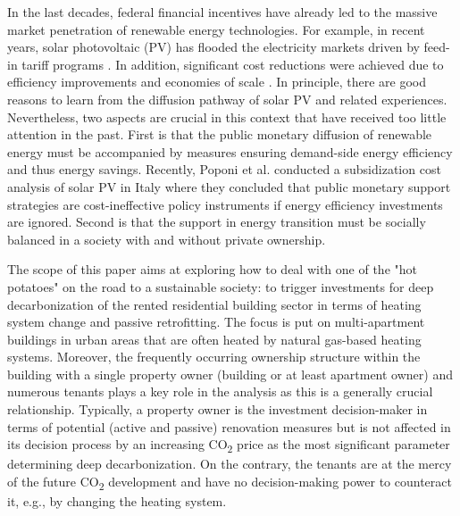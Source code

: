 In the last decades, federal financial incentives have already led to the massive market penetration of renewable energy technologies. For example, in recent years, solar photovoltaic (PV) has flooded the electricity markets driven by feed-in tariff programs \cite{hoppmann2014compulsive}. In addition, significant cost reductions were achieved due to efficiency improvements and economies of scale \cite{haas2011historical}. In principle, there are good reasons to learn from the diffusion pathway of solar PV and related experiences. Nevertheless, two aspects are crucial in this context that have received too little attention in the past. First is that the public monetary diffusion of renewable energy must be accompanied by measures ensuring demand-side energy efficiency and thus energy savings. Recently, Poponi et al. \cite{poponi2021subsidisation} conducted a subsidization cost analysis of solar PV in Italy where they concluded that public monetary support strategies are cost-ineffective policy instruments if energy efficiency investments are ignored. Second is that the support in energy transition must be socially balanced in a society with and without private ownership.\vspace{0.5cm}

The scope of this paper aims at exploring how to deal with one of the "hot potatoes" on the road to a sustainable society: to trigger investments for deep decarbonization of the rented residential building sector in terms of heating system change and passive retrofitting. The focus is put on multi-apartment buildings in urban areas that are often heated by natural gas-based heating systems. Moreover, the frequently occurring ownership structure within the building with a single property owner (building or at least apartment owner) and numerous tenants plays a key role in the analysis as this is a generally crucial relationship. Typically, a property owner is the investment decision-maker in terms of potential (active and passive) renovation measures but is not affected in its decision process by an increasing CO\textsubscript{2} price as the most significant parameter determining deep decarbonization. On the contrary, the tenants are at the mercy of the future CO\textsubscript{2} development and have no decision-making power to counteract it, e.g., by changing the heating system.\vspace{0.5cm}

